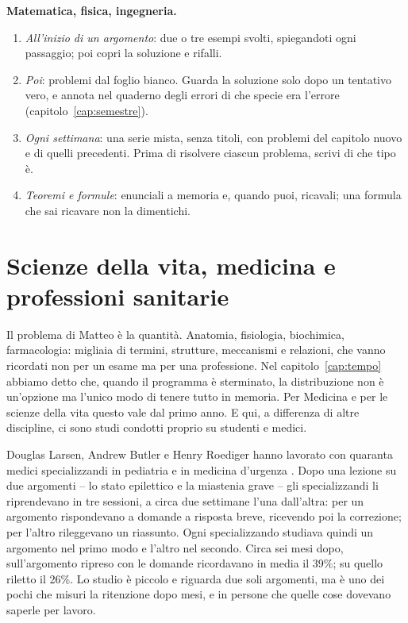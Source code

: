 \begin{inpratica}
\textbf{Matematica, fisica, ingegneria.}
\begin{enumerate}
  \item \emph{All'inizio di un argomento}: due o tre esempi svolti,
        spiegandoti ogni passaggio; poi copri la soluzione e rifalli.
  \item \emph{Poi}: problemi dal foglio bianco. Guarda la soluzione solo
        dopo un tentativo vero, e annota nel quaderno degli errori di
        che specie era l'errore (capitolo~\ref{cap:semestre}).
  \item \emph{Ogni settimana}: una serie mista, senza titoli, con
        problemi del capitolo nuovo e di quelli precedenti. Prima di
        risolvere ciascun problema, scrivi di che tipo è.
  \item \emph{Teoremi e formule}: enunciali a memoria e, quando puoi,
        ricavali; una formula che sai ricavare non la dimentichi.
\end{enumerate}
\end{inpratica}

\section{Scienze della vita, medicina e professioni sanitarie}

Il problema di Matteo è la quantità. Anatomia, fisiologia, biochimica,
farmacologia: migliaia di termini, strutture, meccanismi e relazioni,
che vanno ricordati non per un esame ma per una professione. Nel
capitolo~\ref{cap:tempo} abbiamo detto che, quando il programma è
sterminato, la distribuzione non è un'opzione ma l'unico modo di tenere
tutto in memoria. Per Medicina e per le scienze della vita questo vale
dal primo anno. E qui, a differenza di altre discipline, ci sono studi
condotti proprio su studenti e medici.

Douglas Larsen, Andrew Butler e Henry Roediger hanno lavorato con
quaranta medici specializzandi in pediatria e in medicina d'urgenza
\parencite{larsen2009}. Dopo una lezione su due argomenti -- lo stato
epilettico e la miastenia grave -- gli specializzandi li riprendevano
in tre sessioni, a circa due settimane l'una dall'altra: per un
argomento rispondevano a domande a risposta breve, ricevendo poi la
correzione; per l'altro rileggevano un riassunto. Ogni specializzando
studiava quindi un argomento nel primo modo e l'altro nel secondo.
Circa sei mesi dopo, sull'argomento ripreso con le domande ricordavano
in media il 39\%; su quello riletto il 26\%. Lo studio è piccolo e
riguarda due soli argomenti, ma è uno dei pochi che misuri la
ritenzione dopo mesi, e in persone che quelle cose dovevano saperle
per lavoro.

